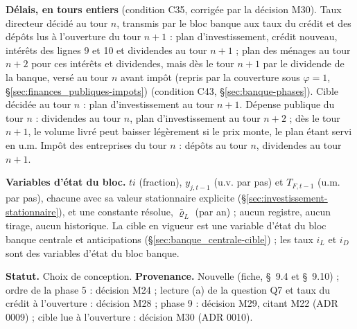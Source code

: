 \documentclass[11pt,a4paper]{article}
\begin{document}
\begin{proposee}
\textbf{Délais, en tours entiers} (condition C35, corrigée par la décision M30). Taux directeur décidé au tour $n$, transmis par le bloc banque aux taux du crédit et des dépôts lus à l'ouverture du tour $n + 1$ : plan d'investissement, crédit nouveau, intérêts des lignes 9 et 10 et dividendes au tour $n + 1$ ; plan des ménages au tour $n + 2$ pour ces intérêts et dividendes, mais dès le tour $n + 1$ par le dividende de la banque, versé au tour $n$ avant impôt (repris par la couverture sous $\varphi = 1$, \S\ref{sec:finances_publiques-impots}) (condition C43, \S\ref{sec:banque-phases}). Cible décidée au tour $n$ : plan d'investissement au tour $n + 1$. Dépense publique du tour $n$ : dividendes au tour $n$, plan d'investissement au tour $n + 2$ ; dès le tour $n + 1$, le volume livré peut baisser légèrement si le prix monte, le plan étant servi en u.m. Impôt des entreprises du tour $n$ : dépôts au tour $n$, dividendes au tour $n + 1$.

\textbf{Variables d'état du bloc.} $\mathit{ti}$ (fraction), $y_{j,t-1}$ (u.v. par pas) et $T_{F,t-1}$ (u.m. par pas), chacune avec sa valeur stationnaire explicite (\S\ref{sec:investissement-stationnaire}), et une constante résolue, $\bar\varrho_L$ (par an) ; aucun registre, aucun tirage, aucun historique. La cible en vigueur est une variable d'état du bloc banque centrale et anticipations (\S\ref{sec:banque_centrale-cible}) ; les taux $i_L$ et $i_D$ sont des variables d'état du bloc banque.

\textbf{Statut.} Choix de conception. \textbf{Provenance.} Nouvelle (fiche, \S~9.4 et \S~9.10) ; ordre de la phase 5 : décision M24 ; lecture (a) de la question Q7 et taux du crédit à l'ouverture : décision M28 ; phase 9 : décision M29, citant M22 (ADR 0009) ; cible lue à l'ouverture : décision M30 (ADR 0010).
\end{proposee}
\end{document}
